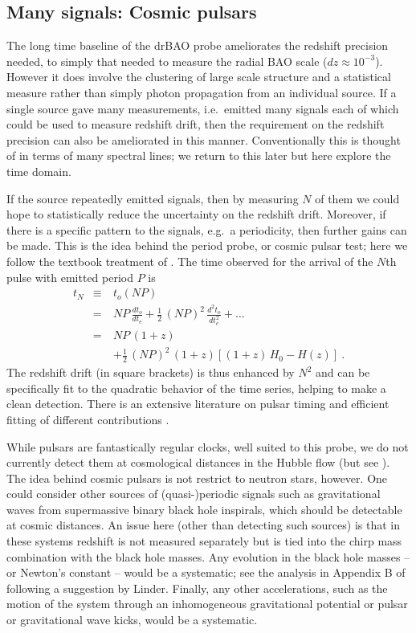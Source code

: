 \documentclass[preprint]{aastex}
\newcommand{\bea}{\begin{eqnarray}}
\newcommand{\eea}{\end{eqnarray}}
\begin{document}
\subsection{Many signals: Cosmic pulsars} 

The long time baseline of the drBAO probe ameliorates the redshift 
precision needed, to simply that needed to measure the radial BAO scale 
($dz\approx10^{-3}$).  However it does involve the clustering of large scale 
structure and a statistical measure rather than simply photon propagation 
from an individual source.  If a single source gave many measurements, 
i.e.\ emitted many signals each of which could be used to measure redshift 
drift, then the requirement on the redshift precision can also be 
ameliorated in this manner.  
Conventionally this is thought of in terms of many spectral lines; we 
return to this later but here explore the time domain. 

If the source repeatedly emitted signals, then by measuring $N$ of them 
we could hope to statistically reduce the uncertainty on the redshift drift.  
Moreover, if there 
is a specific pattern to the signals, e.g.\ a periodicity, then further 
gains can be made.  This is the idea behind the period probe, or cosmic 
pulsar test; here we follow the textbook treatment of \cite{fpoc}.  The time 
observed for the arrival of the $N$th pulse with emitted period $P$ is 
\bea 
t_N&\equiv& t_o(NP)\nonumber\\ 
&=&NP\,\frac{dt_o}{dt_e}+\frac{1}{2}\,(NP)^2\,\frac{d^2t_o}{dt_e^2}+\dots\\ 
&=&NP\,(1+z)\nonumber\\ 
&\quad&+\frac{1}{2}\,(NP)^2\,(1+z)\left[(1+z)\,H_0-H(z)\right]\ . 
\eea 
The redshift drift (in square brackets) is thus enhanced by $N^2$ and 
can be specifically fit to the quadratic behavior of the time series, 
helping to make a clean detection.  There is an extensive literature on 
pulsar timing and efficient fitting of different contributions 
\cite{pulsars}. 

While pulsars are fantastically regular clocks, well suited to this probe, 
we do not currently detect them at cosmological distances in the Hubble 
flow (but see \cite{13071628}).  The idea behind cosmic pulsars is not 
restrict to neutron stars, however.  
One could consider other sources of (quasi-)periodic signals such as 
gravitational waves from supermassive binary black hole inspirals, which 
should be detectable 
at cosmic distances.  An issue here (other than detecting such sources) 
is that in these systems redshift is not measured separately but is tied 
into the chirp mass combination with the black hole masses.  Any evolution 
in the black hole masses -- or Newton's constant -- would be a systematic; 
see the analysis in Appendix B of \cite{09122724} following a suggestion 
by Linder.  Finally, any other accelerations, such as the motion of the system 
through an inhomogeneous gravitational potential or pulsar or gravitational 
wave kicks, would be a systematic. 
\end{document}
